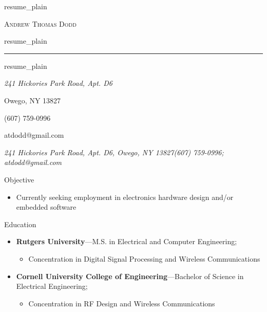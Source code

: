 \documentclass[10pt,oneside]{article}
\makeatletter
\newcommand{\name}{Andrew Thomas Dodd}
\newcommand{\addra}{241 Hickories Park Road, Apt. D6}
\newcommand{\addrb}{Owego, NY 13827}
\newcommand{\addr}{\addra, \addrb}
\newcommand{\phone}{(607) 759-0996}
\newcommand{\email}{atdodd@gmail.com}
\def\txtname{resume_plain}\edef\txtname{\expandafter\strip@prefix\meaning\txtname}
\edef\fname{\jobname}
\newcommand{\bigname}[1]{
	\begin{center}\Huge\scshape#1\end{center}
}
\newenvironment{ressection}[1]{
	\vspace{4pt}
	{\Large#1}
	\begin{itemize}
	\vspace{3pt}
}{
	\end{itemize}
}
\newcommand{\resitem}[1]{
	\vspace{-4pt}
	\item \begin{flushleft} #1 \end{flushleft}
}
\newcommand{\ressubitem}[1]{
	\vspace{-1pt}
	\item \begin{flushleft} #1 \end{flushleft}
}
\newcommand{\resbigitem}[3]{
	\vspace{-5pt}
	\item
	\textbf{#1}---#2; \quad \textit{#3}
}
\newenvironment{ressubsec}[3]{
	\resbigitem{#1}{#2}{#3}
	\vspace{-2pt}
	\begin{itemize}
}{
	\end{itemize}
}
\newcommand{\bigname}[1]{
	\begin{center}\fontfamily{phv}\selectfont\Huge\scshape#1\end{center}
}
\newenvironment{ressection}[1]{
	\vspace{4pt}
	{\fontfamily{phv}\selectfont\Large#1}
	\begin{itemize}[leftmargin=12pt]
	\vspace{3pt}
}{
	\end{itemize}
}
\newcommand{\resitem}[1]{
	\vspace{-4pt}
	\item \begin{flushleft} #1 \end{flushleft}
}
\newcommand{\ressubitem}[1]{
	\vspace{-1pt}
	\item \begin{flushleft} #1 \end{flushleft}
}
\newcommand{\resbigitem}[2]{
	\vspace{-5pt}
	\item
	\textbf{#1}---\textit{#2}
}
\newenvironment{ressubsec}[2]{
	\resbigitem{#1}{#2}
	\vspace{-2pt}
	\begin{itemize}[leftmargin=12pt]
}{
	\end{itemize}
}
\makeatother
\begin{document}
\ifx\fname\txtname
\else
{} \selectfont
\fi

\bigname{\name}

\ifx\fname\txtname
\else
\vspace{-8pt} \rule{\textwidth}{1pt}
\fi

\ifx\fname\txtname
\vspace{-1pt} {\small\itshape \addra

\addrb

\phone

\email}

\else
\vspace{-1pt} {\small\itshape \addr \hfill \phone; \email}
\fi

\vspace{8 pt}


\begin{ressection}{Objective}
	\resitem{Currently seeking employment in electronics hardware design and/or embedded software}
\end{ressection}

\begin{ressection}{Education}

	\begin{ressubsec}{Rutgers University}{M.S. in Electrical and Computer Engineering}
		\ressubitem{Graduated in December 2005}
		\ressubitem{Concentration in Digital Signal Processing and Wireless Communications}
	\end{ressubsec}

	\begin{ressubsec}{Cornell University College of Engineering}{Bachelor of Science in Electrical Engineering}
		\ressubitem{Graduated in May 2002: John McMullen Dean's Scholar}
		\ressubitem{Concentration in RF Design and Wireless Communications}
	\end{ressubsec}

\end{ressection}
\end{document}
